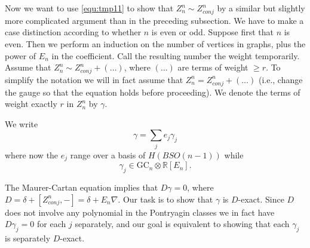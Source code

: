 \documentclass[a4paper]{amsart}
\theoremstyle{plain}
\theoremstyle{definition}
\newcommand{\R}{{\mathbb{R}}}
\newcommand{\GC}{\mathrm{GC}}
\newcommand{\SO}{\mathit{SO}}
\begin{document}
Now we want to use \eqref{equ:tmp11} to show that $Z_{n}^n \sim  Z_{conj}^n$ by a similar but slightly more complicated argument than in the preceding subsection.
We have to make a case distinction according to whether $n$ is even or odd.
Suppose first that $n$ is even.
Then we perform an induction on the number of vertices in graphs, plus the power of $E_n$ in the coefficient.
Call the resulting number the weight temporarily.
Assume that $Z_{n}^n \sim Z_{conj}^n + (\dots)$, where $(\dots)$ are terms of weight $\geq r$.
To simplify the notation we will in fact assume that $Z_{n}^n = Z_{conj}^n + (\dots)$ (i.e., change the gauge so that the equation holds before proceeding).
We denote the terms of weight exactly $r$ in $Z_{n}^n$ by $\gamma$.

We write 
\[
\gamma =\sum_j e_j \gamma_j
\]
where now the $e_j$ range over a basis of $H(B\SO(n-1))$ while 
\[
\gamma_j\in \GC_n \otimes \R[E_{n}].
\]

The Maurer-Cartan equation implies that $D\gamma=0$, where $D=\delta+[Z_{conj}^n,-]=\delta+E_n\nabla$.
Our task is to show that $\gamma$ is $D$-exact. Since $D$ does not involve any polynomial in the Pontryagin classes we in fact have $D\gamma_j=0$ for each $j$ separately, and our goal is equivalent to showing that each $\gamma_j$ is separately $D$-exact.
\end{document}
